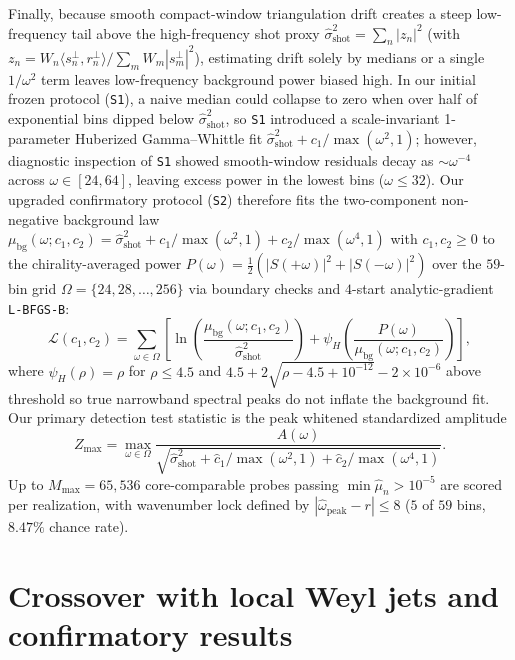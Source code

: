 \documentclass[11pt,a4paper]{article}
\begin{document}
Finally, because smooth compact-window triangulation drift creates a steep
low-frequency tail above the high-frequency shot proxy
$\hat{\sigma}_{\text{shot}}^2 = \sum_n |z_n|^2$ (with $z_n = W_n\langle s_n^\perp, r_n^\perp\rangle / \sum_m W_m|s_m^\perp|^2$),
estimating drift solely by medians or a single $1/\omega^2$ term leaves low-frequency
background power biased high. In our initial frozen protocol (\texttt{S1}), a
naive median could collapse to zero when over half of exponential bins dipped below
$\hat{\sigma}_{\text{shot}}^2$, so \texttt{S1} introduced a scale-invariant 1-parameter
Huberized Gamma--Whittle fit $\hat{\sigma}_{\text{shot}}^2 + c_1/\max(\omega^2,1)$;
however, diagnostic inspection of \texttt{S1} showed smooth-window residuals decay as
$\sim \omega^{-4}$ across $\omega \in [24, 64]$, leaving excess power in the lowest bins
($\omega \le 32$). Our upgraded confirmatory protocol (\texttt{S2}) therefore fits
the two-component non-negative background law
$\mu_{\text{bg}}(\omega; c_1, c_2) = \hat{\sigma}_{\text{shot}}^2 + c_1/\max(\omega^2, 1) + c_2/\max(\omega^4, 1)$
with $c_1, c_2 \ge 0$ to the chirality-averaged power
$P(\omega) = \tfrac12(|S(+\omega)|^2 + |S(-\omega)|^2)$ over the $59$-bin grid
$\Omega = \{24, 28, \dots, 256\}$ via boundary checks and $4$-start analytic-gradient
\texttt{L-BFGS-B}:
\begin{equation}
 \mathcal{L}(c_1, c_2) = \sum_{\omega \in \Omega} \left[
   \ln\!\left(\frac{\mu_{\text{bg}}(\omega; c_1, c_2)}{\hat{\sigma}_{\text{shot}}^2}\right)
   + \psi_H\!\left(\frac{P(\omega)}{\mu_{\text{bg}}(\omega; c_1, c_2)}\right)
 \right],
 \label{eq:whittle}
\end{equation}
where $\psi_H(\rho) = \rho$ for $\rho \le 4.5$ and
$4.5 + 2\sqrt{\rho - 4.5 + 10^{-12}} - 2\times 10^{-6}$ above threshold so true
narrowband spectral peaks do not inflate the background fit. Our primary detection
test statistic is the peak whitened standardized amplitude
\begin{equation}
 Z_{\max} = \max_{\omega \in \Omega}
 \frac{A(\omega)}{\sqrt{\hat{\sigma}_{\text{shot}}^2 + \hat{c}_1/\max(\omega^2, 1) + \hat{c}_2/\max(\omega^4, 1)}}.
 \label{eq:zmax}
\end{equation}
Up to $M_{\max} = 65{,}536$ core-comparable probes passing $\min\hat{\mu}_n > 10^{-5}$
are scored per realization, with wavenumber lock defined by $|\hat{\omega}_{\text{peak}} - r| \le 8$
($5$ of $59$ bins, $8.47\%$ chance rate).

\section{Crossover with local Weyl jets and confirmatory results}\label{sec:results}
\end{document}
